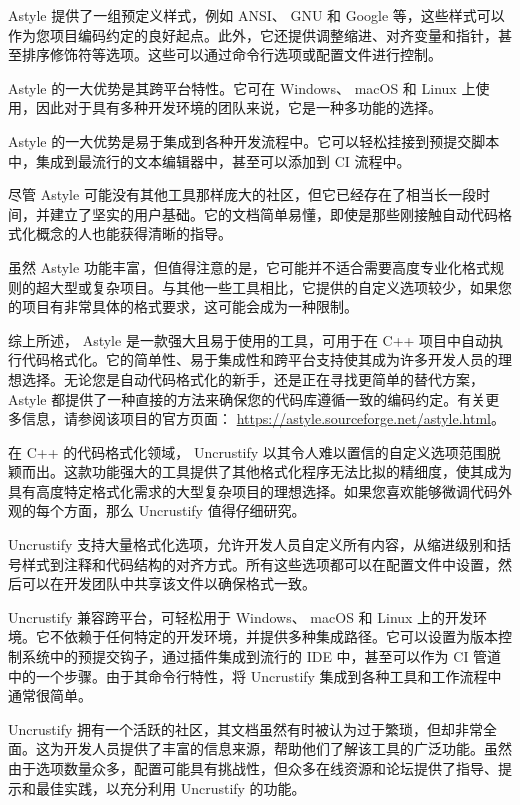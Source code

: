 Astyle 提供了一组预定义样式，例如 ANSI、 GNU 和 Google 等，这些样式可以作为您项目编码约定的良好起点。此外，它还提供调整缩进、对齐变量和指针，甚至排序修饰符等选项。这些可以通过命令行选项或配置文件进行控制。

Astyle 的一大优势是其跨平台特性。它可在 Windows、 macOS 和 Linux 上使用，因此对于具有多种开发环境的团队来说，它是一种多功能的选择。

Astyle 的一大优势是易于集成到各种开发流程中。它可以轻松挂接到预提交脚本中，集成到最流行的文本编辑器中，甚至可以添加到 CI 流程中。

尽管 Astyle 可能没有其他工具那样庞大的社区，但它已经存在了相当长一段时间，并建立了坚实的用户基础。它的文档简单易懂，即使是那些刚接触自动代码格式化概念的人也能获得清晰的指导。

虽然 Astyle 功能丰富，但值得注意的是，它可能并不适合需要高度专业化格式规则的超大型或复杂项目。与其他一些工具相比，它提供的自定义选项较少，如果您的项目有非常具体的格式要求，这可能会成为一种限制。

综上所述， Astyle 是一款强大且易于使用的工具，可用于在 C++ 项目中自动执行代码格式化。它的简单性、易于集成性和跨平台支持使其成为许多开发人员的理想选择。无论您是自动代码格式化的新手，还是正在寻找更简单的替代方案， Astyle 都提供了一种直接的方法来确保您的代码库遵循一致的编码约定。有关更多信息，请参阅该项目的官方页面： \url{https://astyle.sourceforge.net/astyle.html}。


在 C++ 的代码格式化领域， Uncrustify 以其令人难以置信的自定义选项范围脱颖而出。这款功能强大的工具提供了其他格式化程序无法比拟的精细度，使其成为具有高度特定格式化需求的大型复杂项目的理想选择。如果您喜欢能够微调代码外观的每个方面，那么 Uncrustify 值得仔细研究。

Uncrustify 支持大量格式化选项，允许开发人员自定义所有内容，从缩进级别和括号样式到注释和代码结构的对齐方式。所有这些选项都可以在配置文件中设置，然后可以在开发团队中共享该文件以确保格式一致。

Uncrustify 兼容跨平台，可轻松用于 Windows、 macOS 和 Linux 上的开发环境。它不依赖于任何特定的开发环境，并提供多种集成路径。它可以设置为版本控制系统中的预提交钩子，通过插件集成到流行的 IDE 中，甚至可以作为 CI 管道中的一个步骤。由于其命令行特性，将 Uncrustify 集成到各种工具和工作流程中通常很简单。

Uncrustify 拥有一个活跃的社区，其文档虽然有时被认为过于繁琐，但却非常全面。这为开发人员提供了丰富的信息来源，帮助他们了解该工具的广泛功能。虽然由于选项数量众多，配置可能具有挑战性，但众多在线资源和论坛提供了指导、提示和最佳实践，以充分利用 Uncrustify 的功能。


